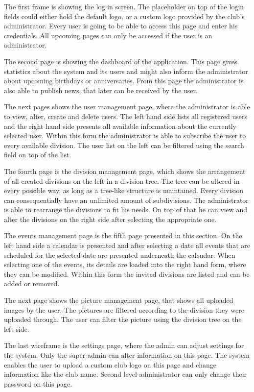 The first frame is showing the log in screen. The placeholder on top of the login fields could either hold the default logo, or a custom logo provided by the club's administrator. Every user is going to be able to access this page and enter his credentials. All upcoming pages can only be accessed if the user is an administrator.

The second page is showing the dashboard of the application. This page gives statistics about the system and its users and might also inform the administrator about upcoming birthdays or anniversaries. From this page the administrator is also able to publish news, that later can be received by the user.

The next pages shows the user management page, where the administrator is able to view, alter, create and delete users. The left hand side lists all registered users and the right hand side presents all available information about the currently selected user. Within this form the administrator is able to subscribe the user to every available division. The user list on the left can be filtered using the search field on top of the list.

The fourth page is the division management page, which shows the arrangement of all created divisions on the left in a division tree. The tree can be altered in every possible way, as long as a tree-like structure is maintained. Every division can consequentially have an unlimited amount of subdivisions. The administrator is able to rearrange the divisions to fit his needs. On top of that he can view and alter the divisions on the right side after selecting the appropriate one. 

The events management page is the fifth page presented in this section. On the left hand side a calendar is presented and after selecting a date all events that are scheduled for the selected date are presented underneath the calendar. When selecting one of the events, its details are loaded into the right hand form, where they can be modified. Within this form the invited divisions are listed and can be added or removed.

The next page shows the picture management page, that shows all uploaded images by the user. The pictures are filtered according to the division they were uploaded through. The user can filter the picture using the division tree on the left side.

The last wireframe is the settings page, where the admin can adjust settings for the system. Only the super admin can alter information on this page. The system enables the user to upload a custom club logo on this page and change information like the club name. Second level administrator can only change their password on this page. 

